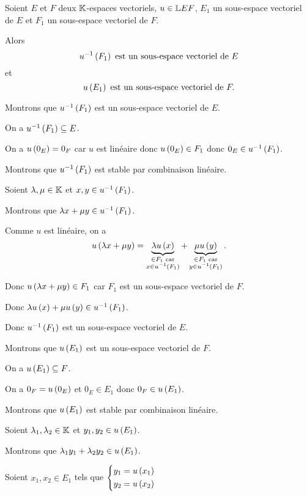 \begin{prop}
Soient \(E\) et \(F\) deux \(\mathbb{K}\)-espaces vectoriels, \(u\in\mathbb{L}{E}{F}\), \(E_1\) un sous-espace vectoriel de \(E\) et \(F_1\) un sous-espace vectoriel de \(F\).

Alors \[u^{-1}\left(F_1\right)\text{ est un sous-espace vectoriel de }E\] et \[u\left(E_1\right)\text{ est un sous-espace vectoriel de }F.\]
\end{prop}

\begin{dem}
Montrons que \(u^{-1}\left(F_1\right)\) est un sous-espace vectoriel de \(E\).

On a \(u^{-1}\left(F_1\right)\subseteq E\).

On a \(u\left(0_E\right)=0_F\) car \(u\) est linéaire donc \(u\left(0_E\right)\in F_1\) donc \(0_E\in u^{-1}\left(F_1\right)\).

Montrons que \(u^{-1}\left(F_1\right)\) est stable par combinaison linéaire.

Soient \(\lambda,\mu\in\mathbb{K}\) et \(x,y\in u^{-1}\left(F_1\right)\).

Montrons que \(\lambda x+\mu y\in u^{-1}\left(F_1\right)\).

Comme \(u\) est linéaire, on a \[u\left(\lambda x+\mu y\right)=\underbrace{\lambda u\left(x\right)}_{\substack{\in F_1\text{ car} \\ x\in u^{-1}\left(F_1\right)}}+\underbrace{\mu u\left(y\right)}_{\substack{\in F_1\text{ car} \\ y\in u^{-1}\left(F_1\right)}}.\]

Donc \(u\left(\lambda x+\mu y\right)\in F_1\) car \(F_1\) est un sous-espace vectoriel de \(F\).

Donc \(\lambda u\left(x\right)+\mu u\left(y\right)\in u^{-1}\left(F_1\right)\).

Donc \(u^{-1}\left(F_1\right)\) est un sous-espace vectoriel de \(E\).

Montrons que \(u\left(E_1\right)\) est un sous-espace vectoriel de \(F\).

On a \(u\left(E_1\right)\subseteq F\).

On a \(0_F=u\left(0_E\right)\) et \(0_E\in E_1\) donc \(0_F\in u\left(E_1\right)\).

Montrons que \(u\left(E_1\right)\) est stable par combinaison linéaire.

Soient \(\lambda_1,\lambda_2\in\mathbb{K}\) et \(y_1,y_2\in u\left(E_1\right)\).

Montrons que \(\lambda_1y_1+\lambda_2y_2\in u\left(E_1\right)\).

Soient \(x_1,x_2\in E_1\) tels que \(\begin{dcases}y_1=u\left(x_1\right) \\ y_2=u\left(x_2\right)\end{dcases}\)


\end{dem}
